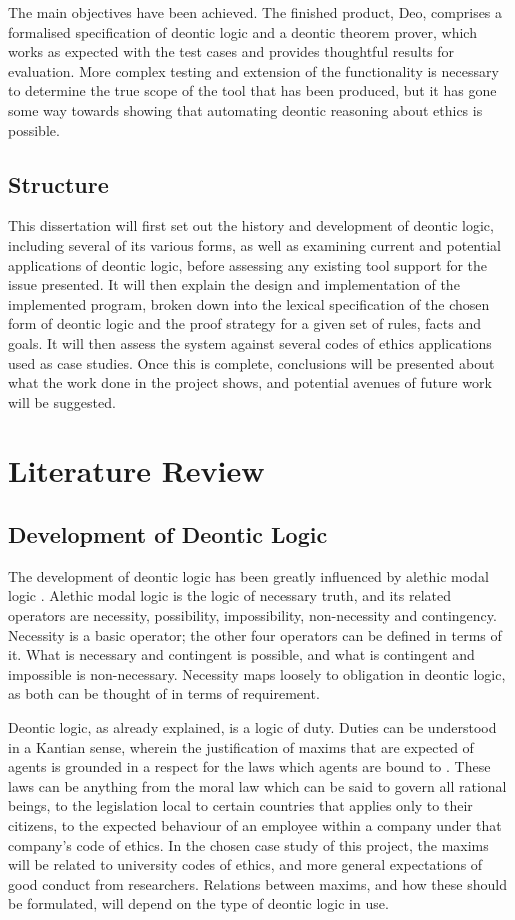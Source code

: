 \documentclass{l4proj}
\begin{document}
The main objectives have been achieved. The finished product, Deo, comprises a formalised specification of deontic logic and a deontic theorem prover, which works as expected with the test cases and provides thoughtful results for evaluation. More complex testing and extension of the functionality is necessary to determine the true scope of the tool that has been produced, but it has gone some way towards showing that automating deontic reasoning about ethics is possible. 

\section{Structure}
This dissertation will first set out the history and development of deontic logic, including several of its various forms, as well as examining current and potential applications of deontic logic, before assessing any existing tool support for the issue presented. It will then explain the design and implementation of the implemented program, broken down into the lexical specification of the chosen form of deontic logic and the proof strategy for a given set of rules, facts and goals. It will then assess the system against several codes of ethics applications used as case studies. Once this is complete, conclusions will be presented about what the work done in the project shows, and potential avenues of future work will be suggested. 

\chapter{Literature Review}

\section{Development of Deontic Logic}
The development of deontic logic has been greatly influenced by alethic modal logic \cite{sep-logic-deontic}. Alethic modal logic is the logic of necessary truth, and its related operators are necessity, possibility, impossibility, non-necessity and contingency. Necessity is a basic operator; the other four operators can be defined in terms of it. What is necessary and contingent is possible, and what is contingent and impossible is non-necessary. Necessity maps loosely to obligation in deontic logic, as both can be thought of in terms of requirement. 

Deontic logic, as already explained, is a logic of duty. Duties can be understood in a Kantian sense, wherein the justification of maxims that are expected of agents is grounded in a respect for the laws which agents are bound to \cite{sep-kant-moral}. These laws can be anything from the moral law which can be said to govern all rational beings, to the legislation local to certain countries that applies only to their citizens, to the expected behaviour of an employee within a company under that company's code of ethics. In the chosen case study of this project, the maxims will be related to university codes of ethics, and more general expectations of good conduct from researchers. Relations between maxims, and how these should be formulated, will depend on the type of deontic logic in use. 
\end{document}
